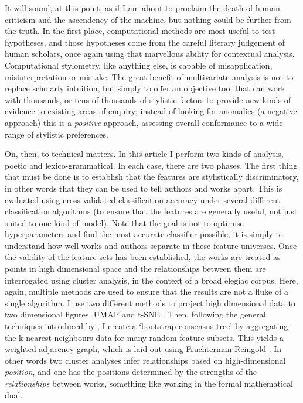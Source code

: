 \documentclass[twocolumn, switch, a4paper]{article} %
\begin{document}
It will sound, at this point, as if I am about to proclaim the death of human
criticism and the ascendency of the machine, but nothing could be further from
the truth. In the first place, computational methods are most useful to test
hypotheses, and those hypotheses come from the careful literary judgement of
human scholars, once again using that marvellous ability for contextual
analysis. Computational stylometry, like anything else, is capable of
misapplication, misinterpretation or mistake. The great benefit of
multivariate analysis is not to replace scholarly intuition, but simply to
offer an objective tool that can work with thousands, or tens of thousands of
stylistic factors to provide new kinds of evidence to existing areas of
enquiry; instead of looking for anomalies (a negative approach) this is a
\emph{positive} approach, assessing overall conformance to a wide range of
stylistic preferences.

On, then, to technical matters. In this article I perform two kinds of
analysis, poetic and lexico-grammatical. In each case, there are two phases.
The first thing that must be done is to establish that the features are
stylistically discriminatory, in other words that they can be used to tell
authors and works apart. This is evaluated using cross-validated
classification accuracy under several different classification algorithms (to
ensure that the features are generally useful, not just suited to one kind of
model). Note that the goal is not to optimise hyperparameters and find the
most accurate classifier possible, it is simply to understand how well works
and authors separate in these feature universes. Once the validity of the
feature sets has been established, the works are treated as points in high
dimensional space and the relationships between them are interrogated using
cluster analysis, in the context of a broad elegiac corpus. Here, again,
multiple methods are used to ensure that the results are not a fluke of a
single algorithm. I use two different methods to project high dimensional data
to two dimensional figures, UMAP \cite{mcinnes_umap_2018} and t-SNE
\cite{van2008visualizing}. Then, following the general techniques introduced
by , I create a `bootstrap consensus tree'
by aggregating the k-nearest neighbours data for many random feature subsets.
This yields a weighted adjacency graph, which is laid out using
Fruchterman-Reingold \cite{fruchterman1991graph}. In other words two cluster
analyses infer relationships based on high-dimensional \emph{position}, and
one has the positions determined by the strengths of the \emph{relationships}
between works, something like working in the formal mathematical dual.
\end{document}
